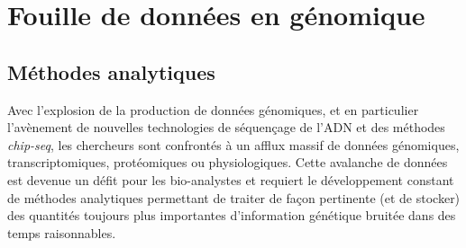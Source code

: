 \section{Fouille de données en génomique}\label{analyseintro}

\subsection{Méthodes analytiques}
Avec l'explosion de la production de données génomiques, et en particulier l'avènement de nouvelles technologies de séquençage de l'ADN et des méthodes \textit{chip-seq}, les chercheurs sont confrontés à un afflux massif de données génomiques, transcriptomiques, protéomiques ou physiologiques. Cette avalanche de données est devenue un défit pour les bio-analystes et requiert le développement constant de méthodes analytiques permettant de traiter de façon pertinente (et de stocker) des quantités toujours plus importantes d'information génétique bruitée dans des temps raisonnables.\\
